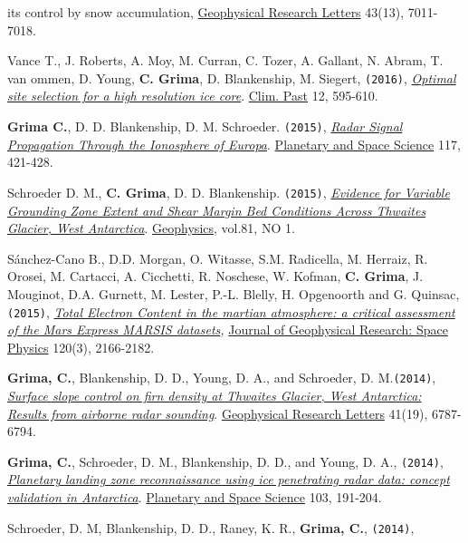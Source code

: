 \begin{etaremune}
{{  its control by snow accumulation}}, \ul{Geophysical Research Letters} 43(13), 7011-7018.
\item
  Vance T., J. Roberts, A. Moy, M. Curran, C. Tozer, A. Gallant, N.
  Abram, T. van ommen, D. Young, \textbf{C. Grima}, D. Blankenship, M.
  Siegert, \texttt{(2016)},
  \href{http://www.clim-past.net/12/595/2016/cp-12-595-2016.pdf}{\emph{Optimal
  site selection for a high resolution ice core}}. \ul{Clim. Past} 12,
  595-610.
\item
  \textbf{Grima C.}, D. D. Blankenship, D. M. Schroeder. \texttt{(2015)},
  \emph{\href{http://www.sciencedirect.com/science/article/pii/S0032063315002470}{Radar
  Signal Propagation Through the Ionosphere of Europa}}. \ul{Planetary and
  Space Science} 117, 421-428.
\item
  Schroeder D. M., \textbf{C. Grima}, D. D. Blankenship. \texttt{(2015)},
  \emph{\href{http://library.seg.org/doi/abs/10.1190/geo2015-0122.1}{Evidence
  for Variable Grounding Zone Extent and Shear Margin Bed Conditions
  Across Thwaites Glacier, West Antarctica}}. \ul{Geophysics}, vol.81, NO 1.
\item
  Sánchez-Cano B., D.D. Morgan, O. Witasse, S.M. Radicella, M. Herraiz,
  R. Orosei, M. Cartacci, A. Cicchetti, R. Noschese, W. Kofman,
  \textbf{C. Grima}, J. Mouginot, D.A. Gurnett, M. Lester, P.-L. Blelly,
  H. Opgenoorth and G. Quinsac, \texttt{(2015)},
  \emph{\href{http://onlinelibrary.wiley.com/doi/10.1002/2014JA020630/abstract}{Total
  Electron Content in the martian atmosphere: a critical assessment of
  the Mars Express MARSIS datasets},} \ul{Journal of Geophysical Research:
  Space Physics} 120(3), 2166-2182.
\item
  \textbf{Grima, C.}, Blankenship, D. D., Young, D. A., and Schroeder,
  D. M.\texttt{(2014)},
  \href{http://onlinelibrary.wiley.com/enhanced/doi/10.1002/2014GL061635/}{\emph{Surface
  slope control on firn density at Thwaites Glacier, West Antarctica:
  Results from airborne radar sounding}}. \ul{Geophysical Research Letters}
  41(19), 6787-6794.
\item
  \textbf{Grima, C.}, Schroeder, D. M., Blankenship, D. D., and Young,
  D. A., \texttt{(2014)},
  \href{http://www.sciencedirect.com/science/article/pii/S0032063314002244}{\emph{Planetary
  landing zone reconnaissance using ice penetrating radar data: concept
  validation in Antarctica}}. \ul{Planetary and Space Science} 103, 191-204.
\item
  Schroeder, D. M, Blankenship, D. D., Raney, K. R., \textbf{Grima, C.},
  \texttt{(2014)},

\end{etaremune}
